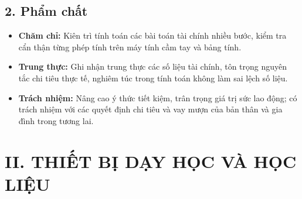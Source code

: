 \documentclass[12pt, a4paper]{article}
\begin{document}
\subsection*{2. Phẩm chất}

\begin{itemize}[leftmargin=1.2cm]
    \item \textbf{Chăm chỉ:} Kiên trì tính toán các bài toán tài chính nhiều bước, kiểm tra cẩn thận từng phép tính trên máy tính cầm tay và bảng tính.
    \item \textbf{Trung thực:} Ghi nhận trung thực các số liệu tài chính, tôn trọng nguyên tắc chi tiêu thực tế, nghiêm túc trong tính toán không làm sai lệch số liệu.
    \item \textbf{Trách nhiệm:} Nâng cao ý thức tiết kiệm, trân trọng giá trị sức lao động; có trách nhiệm với các quyết định chi tiêu và vay mượn của bản thân và gia đình trong tương lai.
\end{itemize}

\vspace{5pt}

\section*{II. THIẾT BỊ DẠY HỌC VÀ HỌC LIỆU}
\end{document}
